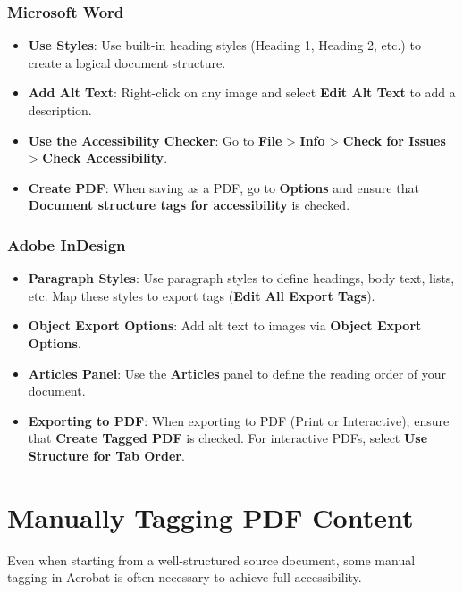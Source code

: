 \subsubsection{Microsoft Word}
\label{ssubsec:ms-word-pdf}
\begin{itemize}
	\item \textbf{Use Styles}: Use built-in heading styles (Heading 1, Heading 2, etc.) to create a logical document structure.
	\item \textbf{Add Alt Text}: Right-click on any image and select \textbf{Edit Alt Text} to add a description.
	\item \textbf{Use the Accessibility Checker}: Go to \textbf{File} > \textbf{Info} > \textbf{Check for Issues} > \textbf{Check Accessibility}.
	\item \textbf{Create PDF}: When saving as a PDF, go to \textbf{Options} and ensure that \textbf{Document structure tags for accessibility} is checked.
\end{itemize}

\subsubsection{Adobe InDesign}
\label{ssubsec:adobe-indesign-pdf}
\begin{itemize}
	\item \textbf{Paragraph Styles}: Use paragraph styles to define headings, body text, lists, etc. Map these styles to export tags (\textbf{Edit All Export Tags}).
	\item \textbf{Object Export Options}: Add alt text to images via \textbf{Object Export Options}.
	\item \textbf{Articles Panel}: Use the \textbf{Articles} panel to define the reading order of your document.
	\item \textbf{Exporting to PDF}: When exporting to PDF (Print or Interactive), ensure that \textbf{Create Tagged PDF} is checked. For interactive PDFs, select \textbf{Use Structure for Tab Order}.
\end{itemize}

\section{Manually Tagging PDF Content}
\label{sec:manual-tagging-pdf}
Even when starting from a well-structured source document, some manual tagging in Acrobat is often necessary to achieve full accessibility.


